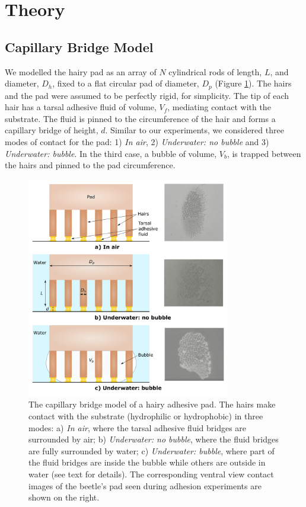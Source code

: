 \documentclass[vruler,JEB]{COB}%
\begin{document}
\section{Theory}

\subsection{Capillary Bridge Model}

We modelled the hairy pad as an array of $N$ cylindrical rods of length,
$L$, and diameter, $D_{h}$, fixed to a flat circular pad of diameter,
$D_{p}$ (Figure \ref{fig:Model}). The hairs and the pad were assumed
to be perfectly rigid, for simplicity. The tip of each hair has a tarsal 
adhesive fluid of volume, $V_{f}$, mediating contact with the substrate.
The fluid is pinned to the circumference of the hair and forms a capillary
bridge of height, $d$. Similar to our experiments, we considered three
modes of contact for the pad: 1) \emph{In air}, 2) \emph{Underwater:
no bubble} and 3) \emph{Underwater: bubble}. In the third case, a
bubble of volume, $V_{b}$, is trapped between the hairs and pinned
to the pad circumference.

\begin{figure}
\includegraphics[width=3.5in]{Figure3-Model_schematic}
\caption{\label{fig:Model}The capillary bridge model of a hairy adhesive pad. The hairs make contact
with the substrate (hydrophilic or hydrophobic) in three modes: a) \emph{In air}, where the tarsal adhesive
fluid bridges are surrounded by air; b) \emph{Underwater: no bubble},
where the fluid bridges are fully surrounded by water; c)\emph{
Underwater: bubble}, where part of the fluid bridges are
inside the bubble while others are outside in water (see text for details). The corresponding
ventral view contact images of the beetle's pad seen during adhesion experiments are shown on the right.}
\end{figure}
\end{document}
